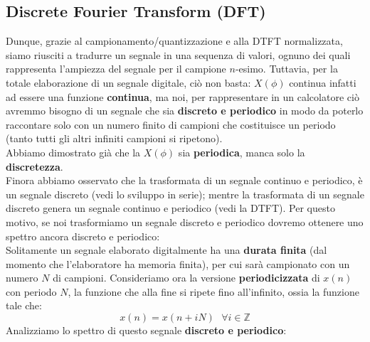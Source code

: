 \subsection{Discrete Fourier Transform (DFT)}
Dunque, grazie al campionamento/quantizzazione e alla DTFT normalizzata, siamo riusciti a tradurre un segnale in una sequenza di valori,
ognuno dei quali rappresenta l'ampiezza del segnale per il campione $n$-esimo. Tuttavia, per la totale elaborazione di un segnale digitale, ciò non basta:
$X(\phi)$ continua infatti ad essere una funzione \textbf{continua}, ma noi, per rappresentare in un calcolatore ciò avremmo bisogno di un segnale che sia \textbf{discreto e periodico}
in modo da poterlo raccontare solo con un numero finito di campioni che costituisce un periodo (tanto tutti gli altri infiniti campioni si ripetono).\\
Abbiamo dimostrato già che la $X(\phi)$ sia \textbf{periodica}, manca solo la \textbf{discretezza}.\\
Finora abbiamo osservato che la trasformata di un segnale continuo e periodico, è un segnale discreto (vedi lo sviluppo in serie); mentre la trasformata di un segnale discreto  genera un segnale
continuo e periodico (vedi la DTFT). Per questo motivo, se noi trasformiamo un segnale discreto e periodico dovremo ottenere uno spettro ancora discreto e periodico:\\
Solitamente un segnale elaborato digitalmente ha una \textbf{durata finita} (dal momento che l'elaboratore ha memoria finita), per cui sarà campionato con un numero $N$ di campioni. 
Consideriamo ora la versione \textbf{periodicizzata} di $x(n)$ con periodo $N$, la funzione che alla fine si ripete fino all'infinito, ossia la funzione tale che:
\begin{equation}
    x(n) = x(n + iN) \text{  } \forall i \in \mathbb{Z}
\end{equation}
Analizziamo lo spettro di questo segnale \textbf{discreto e periodico}:
